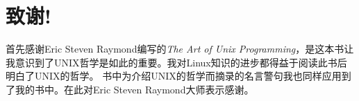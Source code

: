 \chapter*{致谢!}

首先感谢Eric Steven Raymond编写的\textit{The Art of Unix Programming}，是这本书让我意识到了UNIX哲学是如此的重要。我对Linux知识的进步都得益于阅读此书后明白了UNIX的哲学。
书中为介绍UNIX的哲学而摘录的名言警句我也同样应用到了我的书中。在此对Eric Steven Raymond大师表示感谢。

\newpage\thispagestyle{empty}